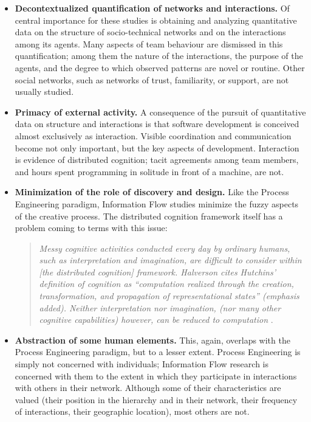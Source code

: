 \begin{itemize}
\item \textbf{Decontextualized quantification of networks and interactions.} Of central importance for these studies is obtaining and analyzing quantitative data on the structure of socio-technical networks and on the interactions among its agents. Many aspects of team behaviour are dismissed in this quantification; among them the nature of the interactions, the purpose of the agents, and the degree to which observed patterns are novel or routine. Other social networks, such as networks of trust, familiarity, or support, are not usually studied.

\item \textbf{Primacy of external activity.} A consequence of the pursuit of quantitative data on structure and interactions is that software development is conceived almost exclusively as interaction. Visible coordination and communication become not only important, but the key aspects of development. Interaction is evidence of distributed cognition; tacit agreements among team members, and hours spent programming in solitude in front of a machine, are not.

\item \textbf{Minimization of the role of discovery and design.} Like the Process Engineering paradigm, Information Flow studies minimize the fuzzy aspects of the creative process. The distributed cognition framework itself has a problem coming to terms with this issue:

\begin{quote}
\label{Nardi}
\emph{Messy cognitive activities conducted every day by ordinary humans, such as interpretation and imagination, are difficult to consider within [the distributed cognition] framework. Halverson cites Hutchins' definition of cognition as ``\emph{computation} realized through the creation, transformation, and propagation of representational states'' (emphasis added). Neither interpretation nor imagination, (nor many other cognitive capabilities) however, can be reduced to computation} \cite{Nardi2002}.
\end{quote}

\item \textbf{Abstraction of some human elements.} This, again, overlaps with the Process Engineering paradigm, but to a lesser extent. Process Engineering is simply not concerned with individuals; Information Flow research is concerned with them to the extent in which they participate in interactions with others in their network. Although some of their characteristics are valued (their position in the hierarchy and in their network, their frequency of interactions, their geographic location), most others are not.

\end{itemize}

